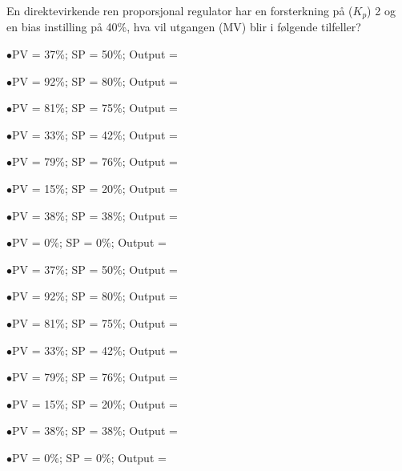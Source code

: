 


En direktevirkende ren proporsjonal regulator har en forsterkning på ($K_p$) 2 og en bias instilling på 40\%, hva vil utgangen (MV) blir i følgende tilfeller? 

\medskip 
\item{$\bullet$}PV = 37\%; SP = 50\%; Output = \underbar{\hskip 50pt}
\vskip 5pt
\item{$\bullet$}PV = 92\%; SP = 80\%; Output = \underbar{\hskip 50pt}
\vskip 5pt
\item{$\bullet$}PV = 81\%; SP = 75\%; Output = \underbar{\hskip 50pt}
\vskip 5pt
\item{$\bullet$}PV = 33\%; SP = 42\%; Output = \underbar{\hskip 50pt}
\vskip 5pt
\item{$\bullet$}PV = 79\%; SP = 76\%; Output = \underbar{\hskip 50pt}
\vskip 5pt
\item{$\bullet$}PV = 15\%; SP = 20\%; Output = \underbar{\hskip 50pt}
\vskip 5pt
\item{$\bullet$}PV = 38\%; SP = 38\%; Output = \underbar{\hskip 50pt}
\vskip 5pt
\item{$\bullet$}PV = 0\%; SP = 0\%; Output = \underbar{\hskip 50pt}
\medskip 







\medskip 
\item{$\bullet$}PV = 37\%; SP = 50\%; Output = 
\vskip 5pt
\item{$\bullet$}PV = 92\%; SP = 80\%; Output = 
\vskip 5pt
\item{$\bullet$}PV = 81\%; SP = 75\%; Output = 
\vskip 5pt
\item{$\bullet$}PV = 33\%; SP = 42\%; Output = 
\vskip 5pt
\item{$\bullet$}PV = 79\%; SP = 76\%; Output = 
\vskip 5pt
\item{$\bullet$}PV = 15\%; SP = 20\%; Output = 
\vskip 5pt
\item{$\bullet$}PV = 38\%; SP = 38\%; Output = 
\vskip 5pt
\item{$\bullet$}PV = 0\%; SP = 0\%; Output = 
\medskip 












